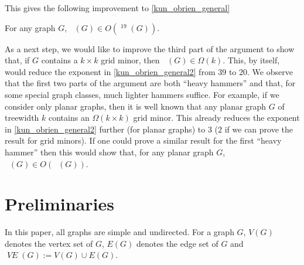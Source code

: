 \documentclass{patmorin}
\DeclareMathOperator{\chicen}{\chi_{\mathrm{cen}}}
\DeclareMathOperator{\chilin}{\chi_{\mathrm{lin}}}
\DeclareMathOperator{\VE}{\mathit{VE}}
\begin{document}
This gives the following improvement to \cref{kun_obrien_general}
\begin{thm}\label{kun_obrien_general2}
  For any graph $G$, $\chicen(G)\in O(\chilin^{19}(G))$.
\end{thm}



As a next step, we would like to improve the third part of the argument to show that, if $G$ contains a $k\times k$ grid minor, then $\chilin(G)\in \Omega(k)$.  This, by itself, would reduce the exponent in \cref{kun_obrien_general2} from $39$ to $20$.  We observe that the first two parts of the argument are both ``heavy hammers'' and that, for some special graph classes, much lighter hammers suffice.  For example, if we consider only planar graphs, then it is well known that any planar graph $G$ of treewidth $k$ contains an $\Omega(k\times k)$ grid minor.  This already reduces the exponent in \cref{kun_obrien_general2} further (for planar graphs) to $3$ ($2$ if we can prove the result for grid minors).  If one could prove a similar result for the first ``heavy hammer'' then this would show that, for any planar graph $G$, $\chicen(G)\in O(\chilin(G))$.


\section{Preliminaries}



In this paper, all graphs are simple and undirected. For a graph $G$, $V(G)$ denotes the vertex set of $G$, $E(G)$ denotes the edge set of $G$ and $\VE(G):=V(G)\cup E(G)$.

\end{document}
